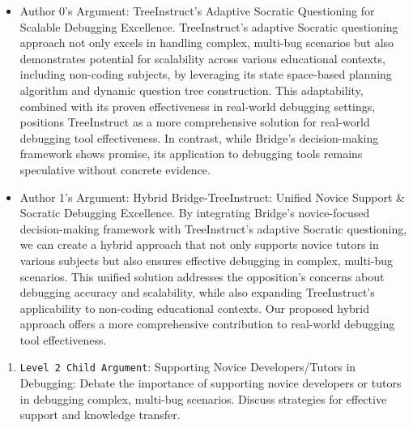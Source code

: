 \begin{enumerate}
\begin{enumerate}
        \begin{itemize}
            \item Author 0's Argument: TreeInstruct's Adaptive Socratic Questioning for Scalable Debugging Excellence. TreeInstruct's adaptive Socratic questioning approach not only excels in handling complex, multi-bug scenarios but also demonstrates potential for scalability across various educational contexts, including non-coding subjects, by leveraging its state space-based planning algorithm and dynamic question tree construction. This adaptability, combined with its proven effectiveness in real-world debugging settings, positions TreeInstruct as a more comprehensive solution for real-world debugging tool effectiveness. In contrast, while Bridge's decision-making framework shows promise, its application to debugging tools remains speculative without concrete evidence.
		\item Author 1's Argument: Hybrid Bridge-TreeInstruct: Unified Novice Support & Socratic Debugging Excellence. By integrating Bridge's novice-focused decision-making framework with TreeInstruct's adaptive Socratic questioning, we can create a hybrid approach that not only supports novice tutors in various subjects but also ensures effective debugging in complex, multi-bug scenarios. This unified solution addresses the opposition's concerns about debugging accuracy and scalability, while also expanding TreeInstruct's applicability to non-coding educational contexts. Our proposed hybrid approach offers a more comprehensive contribution to real-world debugging tool effectiveness.
        \end{itemize}
    \end{enumerate}

    \begin{enumerate}
        \item \texttt{Level 2 Child Argument}: Supporting Novice Developers/Tutors in Debugging: Debate the importance of supporting novice developers or tutors in debugging complex, multi-bug scenarios. Discuss strategies for effective support and knowledge transfer.


\end{enumerate}
\end{enumerate}
